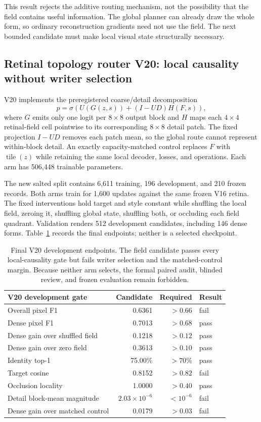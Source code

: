 \documentclass[11pt]{article}
\begin{document}
This result rejects the additive routing mechanism, not the possibility that
the field contains useful information. The global planner can already draw the
whole form, so ordinary reconstruction gradients need not use the field. The
next bounded candidate must make local visual state structurally necessary.

\subsection{Retinal topology router V20: local causality without writer selection}

V20 implements the preregistered coarse/detail decomposition
\[
p=\sigma\left(U(G(z,s))+(I-UD)H(F,s)\right),
\]
where $G$ emits only one logit per $8\times8$ output block and $H$ maps each
$4\times4$ retinal-field cell pointwise to its corresponding $8\times8$
detail patch. The fixed projection $I-UD$ removes each patch mean, so the global
route cannot represent within-block detail. An exactly capacity-matched control
replaces $F$ with $\operatorname{tile}(z)$ while retaining the same local
decoder, losses, and operations. Each arm has 506,448 trainable parameters.

The new salted split contains 6,611 training, 196 development, and 210 frozen
records. Both arms train for 1,600 updates against the same frozen V16 retina.
The fixed interventions hold target and style constant while shuffling the
local field, zeroing it, shuffling global state, shuffling both, or occluding
each field quadrant. Validation renders 512 development candidates, including
146 dense forms. Table~\ref{tab:v20} records the final endpoints; neither is a
selected checkpoint.

\begin{table}[t]
\centering
\small
\begin{tabular}{lrrl}
\toprule
V20 development gate & Candidate & Required & Result \\
\midrule
Overall pixel F1 & 0.6361 & $>0.66$ & fail \\
Dense pixel F1 & 0.7013 & $>0.68$ & pass \\
Dense gain over shuffled field & 0.1218 & $>0.12$ & pass \\
Dense gain over zero field & 0.3613 & $>0.10$ & pass \\
Identity top-1 & 75.00\% & $>70\%$ & pass \\
Target cosine & 0.8152 & $>0.82$ & fail \\
Occlusion locality & 1.0000 & $>0.40$ & pass \\
Detail block-mean magnitude & $2.03{\times}10^{-6}$ & $<10^{-6}$ & fail \\
Dense gain over matched control & 0.0179 & $>0.03$ & fail \\
\bottomrule
\end{tabular}
\caption{Final V20 development endpoints. The field candidate passes every
local-causality gate but fails writer selection and the matched-control margin.
Because neither arm selects, the formal paired audit, blinded review, and frozen
evaluation remain forbidden.}
\label{tab:v20}
\end{table}
\end{document}
